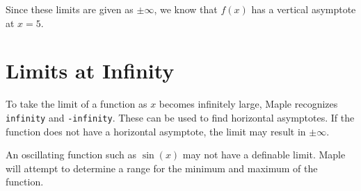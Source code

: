 \noindent
Since these limits are given as $\pm \infty$, we know that $f(x)$ has a vertical asymptote at $x=5$.

\section{Limits at Infinity}

To take the limit of a function as $x$ becomes infinitely large, Maple recognizes \texttt{infinity} and \texttt{-infinity}. These can be used to find horizontal asymptotes. If the function does not have a horizontal asymptote, the limit may result in $\pm \infty$.

\begin{maplegroup}
\begin{mapleinput}
\end{mapleinput}
\mapleresult
\begin{maplelatex}
\end{maplelatex}
\end{maplegroup}
\begin{maplegroup}
\begin{mapleinput}
\end{mapleinput}
\mapleresult
\begin{maplelatex}
\end{maplelatex}
\end{maplegroup}

\begin{maplegroup}
\begin{mapleinput}
\end{mapleinput}
\end{maplegroup}

An oscillating function such as $\sin(x)$ may not have a definable limit. Maple will attempt to determine a range for the minimum and maximum of the function.

\begin{maplegroup}
\begin{mapleinput}
\end{mapleinput}
\mapleresult
\begin{maplelatex}
\end{maplelatex}
\end{maplegroup}

